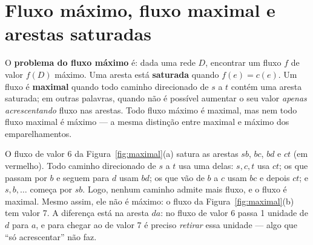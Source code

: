 \section{Fluxo máximo, fluxo maximal e arestas saturadas}\label{sec:fluxomax}
O \textbf{problema do fluxo máximo} é: dada uma rede $D$, encontrar um fluxo $f$ de valor $f(D)$ máximo. Uma aresta está \textbf{saturada} quando $f(e)=c(e)$. Um fluxo é \textbf{maximal} quando todo caminho direcionado de $s$ a $t$ contém uma aresta saturada; em outras palavras, quando não é possível aumentar o seu valor \emph{apenas acrescentando} fluxo nas arestas. Todo fluxo máximo é maximal, mas nem todo fluxo maximal é máximo --- a mesma distinção entre maximal e máximo dos emparelhamentos.

\begin{exemplo}\label{ex:maximal}
O fluxo de valor 6 da Figura~\ref{fig:maximal}(a) satura as arestas $sb$, $bc$, $bd$ e $ct$ (em vermelho). Todo caminho direcionado de $s$ a $t$ usa uma delas: $s,c,t$ usa $ct$; os que passam por $b$ e seguem para $d$ usam $bd$; os que vão de $b$ a $c$ usam $bc$ e depois $ct$; e $s,b,\dots$ começa por $sb$. Logo, nenhum caminho admite mais fluxo, e o fluxo é maximal. Mesmo assim, ele não é máximo: o fluxo da Figura~\ref{fig:maximal}(b) tem valor 7. A diferença está na aresta $da$: no fluxo de valor 6 passa 1 unidade de $d$ para $a$, e para chegar ao de valor 7 é preciso \emph{retirar} essa unidade --- algo que ``só acrescentar'' não faz.
\begin{figura}
\hspace{4mm}
\end{figura}
\end{exemplo}

